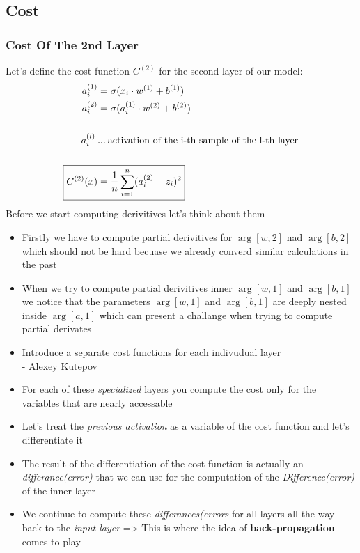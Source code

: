\documentclass{article}
\begin{document}
\subsection{Cost}
\subsubsection{Cost Of The 2nd Layer}
Let's define the cost function $C^{(2)}$ for the second layer of our model:
\begin{align}
    \arg[a_i, 1] &= \sigma(x_i \cdot w^{(1)} + b^{(1)})\\
    \arg[a_i, 2] &= \sigma(a_i^{(1)} \cdot \arg[w, 2] + \arg[b, 2])\\
    \\
    \text{$a_i^{(l)}$}  \: &\text{...} \: \text{activation of the i-th sample of the l-th layer}
    \\
    \\
    \Aboxed{C^{(2)}(x) &= \avgsum[i, n](a_i^{(2)} - z_i)^2} 
\end{align}
Before we start computing derivitives let's think about them \\
\begin{itemize}
    \item {Firstly we have to compute partial derivitives for $\arg[w, 2]$ nad $\arg[b, 2]$ which should not be hard becuase we already converd similar calculations in the past}
    \item {When we try to compute partial derivitives inner $\arg[w, 1]$ and $\arg[b, 1]$ we notice that the parameters $\arg[w, 1]$ and $\arg[b, 1]$ are deeply nested inside $\arg[a, 1]$ which can present a challange when trying to compute partial derivates}
    \item {Introduce a separate cost functions for each indivudual layer\\
                                                        - Alexey Kutepov}
    \item {For each of these \textit{specialized} layers you compute the cost only for the variables that are nearly accessable}
    \item {Let's treat the \textit{previous activation} as a variable of the cost function and let's differentiate it}
    \item {The result of the differentiation of the cost function is actually an \textit{differance(error)} that we can use for the computation of the \textit{Difference(error)} of the inner layer}
    \item {We continue to compute these \textit{differances(errors} for all layers all the way back to the \textit{input layer} => This is where the idea of \textbf{back-propagation} comes to play}
\end{itemize}
\end{document}
